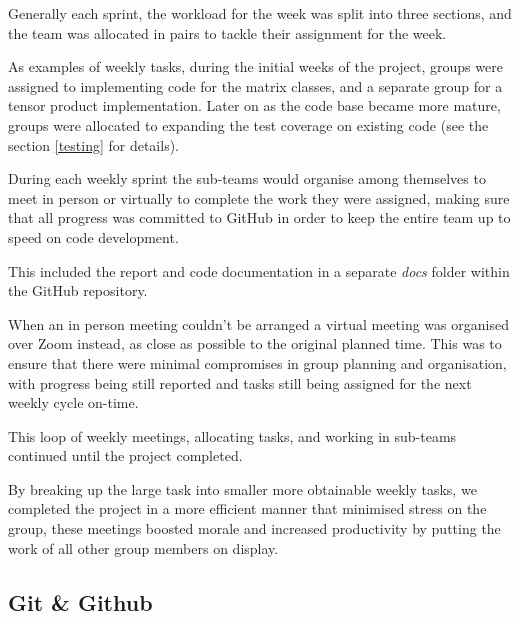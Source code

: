 \documentclass{article}
\begin{document}
Generally each sprint, the workload for the week was split into three sections, and the team was allocated in pairs to tackle their assignment for the week.

As examples of weekly tasks, during the initial weeks of the project, groups were assigned to implementing code for the matrix classes, and a separate group for a tensor product implementation. Later on as the code base became more mature, groups were allocated to expanding the test coverage on existing code (see the section \ref{testing} for details).

During each weekly sprint the sub-teams would organise among themselves to meet in person or virtually to complete the work they were assigned, making sure that all progress was committed to GitHub in order to keep the entire team up to speed on code development.

This included the report and code documentation in a separate \textit{docs} folder within the GitHub repository.

When an in person meeting couldn't be arranged a virtual meeting was organised over Zoom instead, as close as possible to the original planned time. This was to ensure that there were minimal compromises in group planning and organisation, with progress being still reported and tasks still being assigned for the next weekly cycle on-time.

This loop of weekly meetings, allocating tasks, and working in sub-teams continued until the project completed. 

By breaking up the large task into smaller more obtainable weekly tasks, we completed the project in a more efficient manner that minimised stress on the group, these meetings boosted morale and increased productivity by putting the work of all other group members on display.

\subsection{\label{git}Git \& Github}
\end{document}
